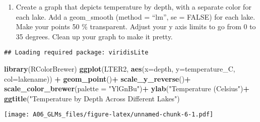 \documentclass[]{article}
\newenvironment{Shaded}{\begin{snugshade}}{\end{snugshade}}
\newcommand{\KeywordTok}[1]{\textcolor[rgb]{0.13,0.29,0.53}{\textbf{#1}}}
\newcommand{\DataTypeTok}[1]{\textcolor[rgb]{0.13,0.29,0.53}{#1}}
\newcommand{\StringTok}[1]{\textcolor[rgb]{0.31,0.60,0.02}{#1}}
\newcommand{\CommentTok}[1]{\textcolor[rgb]{0.56,0.35,0.01}{\textit{#1}}}
\newcommand{\OperatorTok}[1]{\textcolor[rgb]{0.81,0.36,0.00}{\textbf{#1}}}
\newcommand{\NormalTok}[1]{#1}
\providecommand{\tightlist}{%
  \setlength{\itemsep}{0pt}\setlength{\parskip}{0pt}}
\begin{document}
\begin{enumerate}
\def\labelenumi{\arabic{enumi}.}
\setcounter{enumi}{15}
\tightlist
\item
  Create a graph that depicts temperature by depth, with a separate
  color for each lake. Add a geom\_smooth (method = ``lm'', se = FALSE)
  for each lake. Make your points 50 \% transparent. Adjust your y axis
  limits to go from 0 to 35 degrees. Clean up your graph to make it
  pretty.
\end{enumerate}

\begin{Shaded}
\end{Shaded}

\begin{verbatim}
## Loading required package: viridisLite
\end{verbatim}

\begin{Shaded}
\begin{Highlighting}[]
\KeywordTok{library}\NormalTok{(RColorBrewer)}
\KeywordTok{ggplot}\NormalTok{(LTER2, }\KeywordTok{aes}\NormalTok{(}\DataTypeTok{x=}\NormalTok{depth, }\DataTypeTok{y=}\NormalTok{temperature_C, }\DataTypeTok{col=}\NormalTok{lakename)) }\OperatorTok{+}
\StringTok{  }\KeywordTok{geom_point}\NormalTok{()}\OperatorTok{+}
\StringTok{  }\KeywordTok{scale_y_reverse}\NormalTok{()}\OperatorTok{+}
\StringTok{  }\KeywordTok{scale_color_brewer}\NormalTok{(}\DataTypeTok{palette =} \StringTok{"YlGnBu"}\NormalTok{)}\OperatorTok{+}
\StringTok{  }\KeywordTok{ylab}\NormalTok{(}\StringTok{"Temperature (Celsius"}\NormalTok{)}\OperatorTok{+}
\StringTok{  }\KeywordTok{ggtitle}\NormalTok{(}\StringTok{"Temperature by Depth Across Different Lakes"}\NormalTok{)}
\end{Highlighting}
\end{Shaded}

\texttt{[image: A06\_GLMs\_files/figure-latex/unnamed-chunk-6-1.pdf]}
\end{document}
